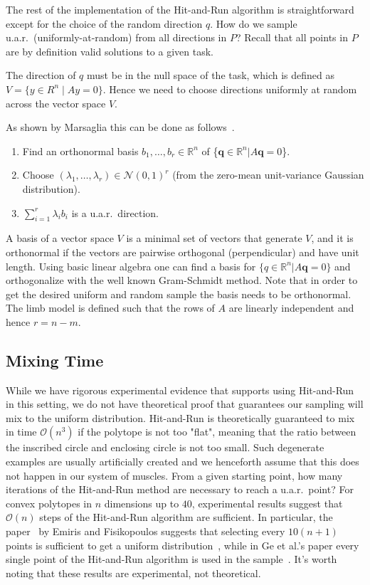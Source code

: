 \documentclass[letterpaper]{article}
\begin{document}
The rest of the implementation of the Hit-and-Run algorithm is straightforward except for the choice of the random direction $q$. How do we sample u.a.r.\ (uniformly-at-random) from all directions in $P$?
Recall that all points in $P$ are by definition valid solutions to a given task.

The direction of $q$ must be in the null space of the task, which is defined as $V = \{ y \in R^n \mid Ay = 0\}$. Hence we need to choose  directions uniformly at random across the vector space $V$.

As shown by Marsaglia this can be done as follows~\cite{Marsaglia}.
\begin{enumerate}
\item
Find an orthonormal basis $b_1, \dots, b_r \in \mathbb{R}^{n}$ of \{$\textbf{q} \in \mathbb{R}^n | A\textbf{q} = 0$\}.
\item
Choose $(\lambda_1, \dots, \lambda_r) \in \mathcal{N}(0,1)^r$ (from the zero-mean unit-variance Gaussian distribution).
\item
$\sum_{i=1}^r \lambda_i b_i$ is a u.a.r.\ direction.
\end{enumerate}

A basis of a vector space $V$ is a minimal set of vectors that generate $V$, and it is orthonormal if the vectors are pairwise orthogonal (perpendicular) and have unit length. Using basic linear algebra one can find a basis for $\{q \in \mathbb{R}^n | A\textbf{q} = 0\}$ and orthogonalize with the well known Gram-Schmidt method. Note that in order to get the desired uniform and random sample the basis needs to be orthonormal. The limb model is defined such that the rows of $A$ are linearly independent and hence $r=n-m$.

\subsection*{Mixing Time}
\label{sec_lengthrun}
While we have rigorous experimental evidence that supports using Hit-and-Run in this setting, we do not have theoretical proof that guarantees our sampling will mix to the uniform distribution. Hit-and-Run is theoretically guaranteed to mix in time $\mathcal{O}(n^3)$ if the polytope is not too "flat", meaning that the ratio between the inscribed circle and enclosing circle is not too small. Such degenerate examples are usually artificially created and we henceforth assume that this does not happen in our system of muscles.
From a given starting point, how many iterations of the Hit-and-Run method are necessary to reach a u.a.r.\ point?
For convex polytopes in $n$ dimensions up to $40$, experimental results suggest that $\mathcal{O}(n)$ steps of the Hit-and-Run algorithm are sufficient.
In particular, the paper~\cite{emiris2013efficient} by Emiris and Fisikopoulos suggests that selecting every $10(n + 1)$ points is sufficient to get a uniform distribution~\cite{emiris2013efficient}, while in Ge et al.'s paper every single point of the Hit-and-Run algorithm is used in the sample~\cite{Ge}. It's worth noting that these results are experimental, not theoretical.
\end{document}
